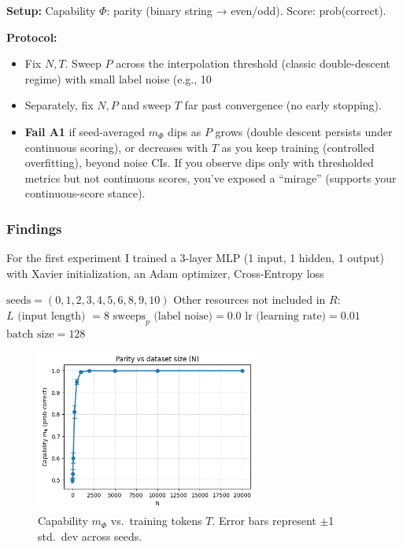 \documentclass[12pt]{article}
\begin{document}
\textbf{Setup:} Capability $\Phi$: parity (binary string → even/odd). Score: prob(correct).

\textbf{Protocol:}
\begin{itemize}
    \item Fix $N,T$. Sweep $P$ across the interpolation threshold (classic double-descent regime) with small label noise (e.g., 10%
    \item Separately, fix $N,P$ and sweep $T$ far past convergence (no early stopping).
    \item \textbf{Fail A1} if seed-averaged $m_\Phi$ dips as $P $ grows (double descent persists under continuous scoring), or decreases with $T$ as you keep training (controlled overfitting), beyond noise CIs. If you observe dips only with thresholded metrics but not continuous scores, you’ve exposed a “mirage” (supports your continuous-score stance).
\end{itemize}

\subsubsection{Findings}

For the first experiment I trained a 3-layer MLP (1 input, 1 hidden, 1 output) with Xavier initialization, an Adam optimizer, Cross-Entropy loss

$\text{seeds} = (0,1,2,3,4,5,6,8,9,10)$
Other resources not included in $R$:
$L\text{ (input length) }=8$
$\mathrm{sweeps}_p \text{ (label noise)}=0.0$
$\text{lr (learning rate)}=0.01$
$\text{batch size}=128$

\begin{figure}[h]
    \centering
    \includegraphics[width=0.65\textwidth]{A1_parity/parity_N.png}
    \caption{Capability $m_\Phi$ vs.~training tokens $T$. Error bars represent $\pm$1 std.~dev across seeds.}
    \label{fig:mphi-scaling}
\end{figure}
\end{document}
